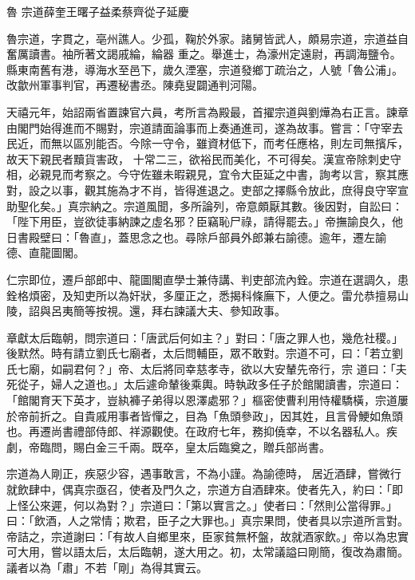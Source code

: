 
\begin{pinyinscope}

 魯
 宗道薛奎王曙子益柔蔡齊從子延慶



 魯宗道，字貫之，亳州譙人。少孤，鞠於外家。諸舅皆武人，頗易宗道，宗道益自奮厲讀書。袖所著文謁戚綸，綸器
 重之。舉進士，為濠州定遠尉，再調海鹽令。縣東南舊有港，導海水至邑下，歲久湮塞，宗道發鄉丁疏治之，人號「魯公浦」。改歙州軍事判官，再遷秘書丞。陳堯叟闢通判河陽。



 天禧元年，始詔兩省置諫官六員，考所言為殿最，首擢宗道與劉燁為右正言。諫章由閣門始得進而不賜對，宗道請面論事而上奏通進司，遂為故事。嘗言：「守宰去民近，而無以區別能否。今除一守令，雖資材低下，而考任應格，則左司無擯斥，故天下親民者黷貨害政，
 十常二三，欲裕民而美化，不可得矣。漢宣帝除刺史守相，必親見而考察之。今守佐雖未暇親見，宜令大臣延之中書，詢考以言，察其應對，設之以事，觀其施為才不肖，皆得進退之。吏部之擇縣令放此，庶得良守宰宣助聖化矣。」真宗納之。宗道風聞，多所論列，帝意頗厭其數。後因對，自訟曰：「陛下用臣，豈欲徒事納諫之虛名邪？臣竊恥尸祿，請得罷去。」帝撫諭良久，他日書殿壁曰：「魯直」，蓋思念之也。尋除戶部員外郎兼右諭德。逾年，遷左諭
 德、直龍圖閣。



 仁宗即位，遷戶部郎中、龍圖閣直學士兼侍講、判吏部流內銓。宗道在選調久，患銓格煩密，及知吏所以為奸狀，多厘正之，悉揭科條廡下，人便之。雷允恭擅易山陵，詔與呂夷簡等按視。還，拜右諫議大夫、參知政事。



 章獻太后臨朝，問宗道曰：「唐武后何如主？」對曰：「唐之罪人也，幾危社稷。」後默然。時有請立劉氏七廟者，太后問輔臣，眾不敢對。宗道不可，曰：「若立劉氏七廟，如嗣君何？」帝、太后將同幸慈孝寺，欲以大安輦先帝行，宗
 道曰：「夫死從子，婦人之道也。」太后遽命輦後乘輿。時執政多任子於館閣讀書，宗道曰：「館閣育天下英才，豈紈褲子弟得以恩澤處邪？」樞密使曹利用恃權驕橫，宗道屢於帝前折之。自貴戚用事者皆憚之，目為「魚頭參政」，因其姓，且言骨鯁如魚頭也。再遷尚書禮部侍郎、祥源觀使。在政府七年，務抑僥幸，不以名器私人。疾劇，帝臨問，賜白金三千兩。既卒，皇太后臨奠之，贈兵部尚書。



 宗道為人剛正，疾惡少容，遇事敢言，不為小謹。為諭德時，
 居近酒肆，嘗微行就飲肆中，偶真宗亟召，使者及門久之，宗道方自酒肆來。使者先入，約曰：「即上怪公來遲，何以為對？」宗道曰：「第以實言之。」使者曰：「然則公當得罪。」曰：「飲酒，人之常情；欺君，臣子之大罪也。」真宗果問，使者具以宗道所言對。帝詰之，宗道謝曰：「有故人自鄉里來，臣家貧無杯盤，故就酒家飲。」帝以為忠實可大用，嘗以語太后，太后臨朝，遂大用之。初，太常議謚曰剛簡，復改為肅簡。議者以為「肅」不若「剛」為得其實云。




\end{pinyinscope}
